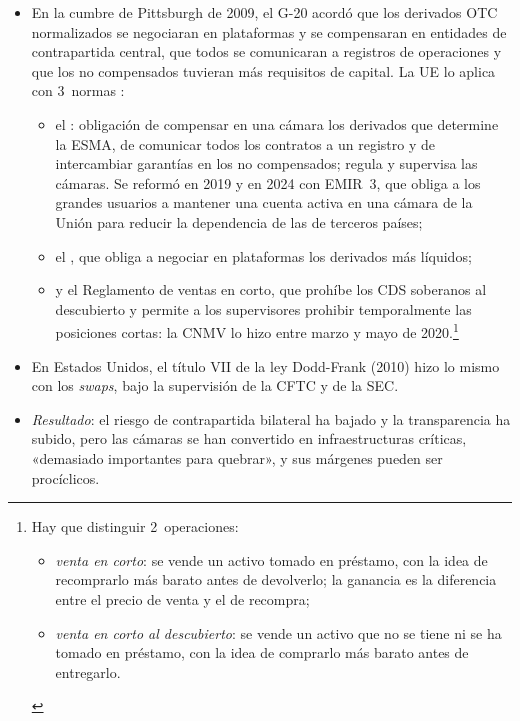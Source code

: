 \documentclass[11pt]{article}
\begin{document}
\begin{itemize}
\item En la cumbre de Pittsburgh de 2009, el G-20 acordó que los derivados OTC normalizados se negociaran en plataformas y se compensaran en entidades de contrapartida central, que todos se comunicaran a registros de operaciones y que los no compensados tuvieran más requisitos de capital\nocite{G20Pittsburgh2009}. La UE lo aplica con 3~normas :
  \begin{itemize}
  \item el \nocite{UE2012EMIR}: obligación de compensar en una cámara los derivados que determine la ESMA, de comunicar todos los contratos a un registro y de intercambiar garantías en los no compensados; regula y supervisa las cámaras. Se reformó en 2019\nocite{UE2019EMIRRefit,UE2019EMIR22} y en 2024 con EMIR~3, que obliga a los grandes usuarios a mantener una cuenta activa en una cámara de la Unión para reducir la dependencia de las de terceros países\nocite{UE2024EMIR3};
  \item el , que obliga a negociar en plataformas los derivados más líquidos\nocite{UE2014MiFIR};
  \item y el Reglamento de ventas en corto, que prohíbe los CDS soberanos al descubierto y permite a los supervisores prohibir temporalmente las posiciones cortas\nocite{UE2012VentasCorto}: la CNMV lo hizo entre marzo y mayo de 2020.\footnote{Hay que distinguir 2~operaciones:
\begin{itemize}
\item \emph{venta en corto}: se vende un activo tomado en préstamo, con la idea de recomprarlo más barato antes de devolverlo; la ganancia es la diferencia entre el precio de venta y el de recompra;
\item \emph{venta en corto al descubierto}: se vende un activo que no se tiene ni se ha tomado en préstamo, con la idea de comprarlo más barato antes de entregarlo.
\end{itemize}}
  \end{itemize}
\item En Estados Unidos, el título VII de la ley Dodd-Frank (2010) hizo lo mismo con los \emph{swaps}, bajo la supervisión de la CFTC y de la SEC\nocite{DoddFrank2010}.
\item \emph{Resultado}: el riesgo de contrapartida bilateral ha bajado y la transparencia ha subido, pero las cámaras se han convertido en infraestructuras críticas, «demasiado importantes para quebrar», y sus márgenes pueden ser procíclicos.
\end{itemize}
\end{document}
